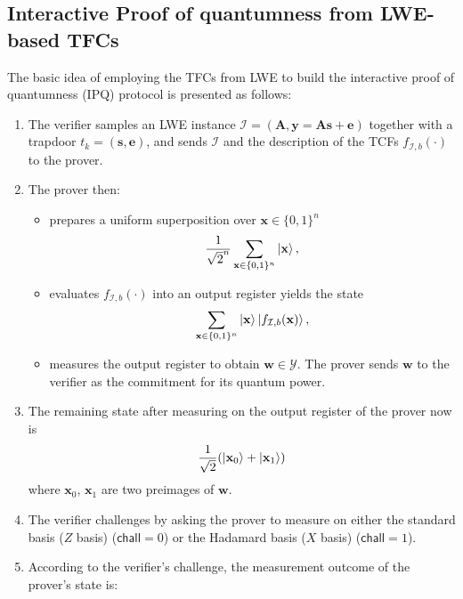 \documentclass[cryptography,review,submit,pdftex,moreauthors,amsmath,amssymb,aps,strict]{Definitions/mdpi}
\begin{document}
\subsection{Interactive Proof of quantumness from LWE-based TFCs}
The basic idea of employing the TFCs from LWE to build the interactive proof of quantumness (IPQ) protocol is presented as follows:
\begin{enumerate}
    \item The verifier samples an LWE instance $\mathcal{I}=(\mathbf{A},\mathbf{y}=\mathbf{A}\mathbf{s}+\mathbf{e})$ together with a trapdoor $t_{k}=(\mathbf{s},\mathbf{e})$, and sends $\mathcal{I}$ and the description of the TCFs $f_{\mathcal{I},b}(\cdot)$ to the prover.
    \item The prover then:
    \begin{itemize}
        \item prepares a uniform superposition over $\mathbf{x}\in\{0,1\}^n$
        \begin{align}
            \frac{1}{\sqrt{2}^n}\sum_{\mathbf{x}\in\{0,1\}^n}\ket{\mathbf{x}},
        \end{align}
        \item evaluates $f_{\mathcal{I},b}(\cdot)$ into an output register yields the state
        \begin{align}
            \sum_{\mathbf{x}\in\{0,1\}^n}\ket{\mathbf{x}}\ket{f_{\mathcal{I},b}(\mathbf{x})},
        \end{align}        
        \item measures the output register to obtain $\mathbf{w}\in\mathcal{Y}$.
    The prover sends $\mathbf{w}$ to the verifier as the commitment for its quantum power.
    \end{itemize}
    \item The remaining state after measuring on the output register of the prover now is
    \begin{align}
        \frac{1}{\sqrt{2}}(\ket{\mathbf{x}_0}+\ket{\mathbf{x}_1})
    \end{align}
    where $\mathbf{x}_0$, $\mathbf{x}_1$ are two preimages of $\mathbf{w}$.
    \item The verifier challenges by asking the prover to measure on either the standard basis ($Z$ basis) ($\mathsf{chall}=0$) or the Hadamard basis ($X$ basis) ($\mathsf{chall}=1$).
    \item According to the verifier's challenge, the measurement outcome of the prover's state is:
    \begin{itemize}

\end{itemize}
\end{enumerate}
\end{document}
